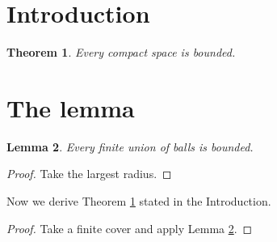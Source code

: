 \documentclass{article}
\newtheorem{theorem}{Theorem}
\newtheorem{lemma}[theorem]{Lemma}
\begin{document}
\section{Introduction}
\begin{theorem}\label{main} Every compact space is bounded. \end{theorem}
\section{The lemma}
\begin{lemma}\label{aux} Every finite union of balls is bounded. \end{lemma}
\begin{proof} Take the largest radius. \end{proof}

Now we derive Theorem \ref{main} stated in the Introduction.

\begin{proof} Take a finite cover and apply Lemma \ref{aux}. \end{proof}
\end{document}
